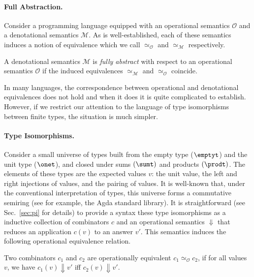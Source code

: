 \paragraph*{Full Abstraction.} Consider a programming language equipped with an
operational semantics $\mathcal{O}$ and a denotational semantics
$\mathcal{M}$. As is well-established, each of these semantics induces a notion
of equivalence which we call $\simeq_{\mathcal{O}}$ and $\simeq_{\mathcal{M}}$
respectively.

\begin{definition} A denotational semantics $\mathcal{M}$ is
  \emph{fully abstract} with respect to an operational semantics $\mathcal{O}$
  if the induced equivalences $\simeq_{\mathcal{M}}$ and $\simeq_{\mathcal{O}}$
  coincide.
\end{definition}

In many languages, the correspondence between operational and denotational
equivalences does not hold and when it does it is quite complicated to
establish. However, if we restrict our attention to the language of type
isomorphisms between finite types, the situation is much simpler.

\paragraph*{Type Isomorphisms.} Consider a small universe of types built from
the empty type ($\emptyt$) and the unit type ($\onet$), and closed under sums
$(\sumt)$ and products $(\prodt)$. The elements of these types are the expected
values $v$: the unit value, the left and right injections of values, and the
pairing of values. It is well-known that, under the conventional interpretation
of types, this universe forms a commutative semiring (see for example, the Agda
standard library). It is straightforward (see Sec.~\ref{sec:pi} for details) to
provide a syntax these type isomorphisms as a inductive collection of
combinators $c$ and an operational semantics $\Downarrow$ that reduces an
application $c(v)$ to an answer $v'$. This semantics induces the following
operational equivalence relation.

\begin{definition}
  Two combinators $c_1$ and $c_2$ are operationally equivalent
  $c_1 \simeq_{\mathcal{O}} c_2$, if for all values $v$, we have
  $c_1(v) \Downarrow v'$ iff $c_2(v) \Downarrow v'$.
\end{definition}

